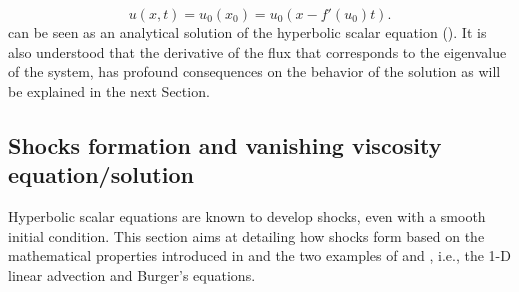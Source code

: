 %
\begin{equation}\label{eq:ivp5_sct1b}
u(x,t) = u_0(x_0) = u_0(x - f'(u_0)t) .
\end{equation}
%
 can be seen as an analytical solution of the hyperbolic scalar equation (). It is also understood that the derivative of the flux that corresponds to the eigenvalue of the system, has profound consequences on the behavior of the solution as will be explained in the next Section. %

\subsection{Shocks formation and vanishing viscosity equation/solution}\label{sec:shock_form_sct1b}
Hyperbolic scalar equations are known to develop shocks, even with a smooth initial condition. This section aims at detailing how shocks form based on the mathematical properties introduced in  and the two examples of  and , i.e., the 1-D linear advection and Burger's equations.\\

